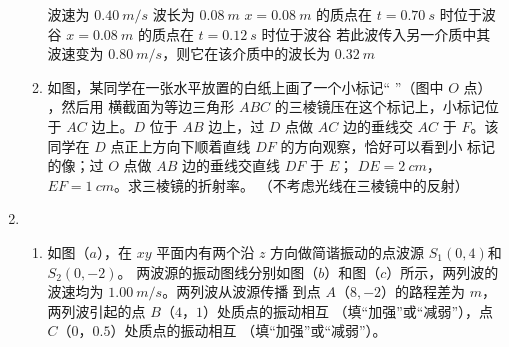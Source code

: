 \begin{enumerate}
\begin{enumerate}
\fivechoices
{波速为 $ 0.40 \ m /s $}
{波长为 $ 0.08 \ m $}
{$ x=0.08 \ m $ 的质点在 $ t=0.70 \ s $ 时位于波谷}
{$ x=0.08 \ m $ 的质点在 $ t=0.12 \ s $ 时位于波谷}
{若此波传入另一介质中其波速变为 $ 0.80 \ m /s $，则它在该介质中的波长为 $ 0.32 \ m $}






\item 
如图，某同学在一张水平放置的白纸上画了一个小标记“ ”（图中 $ O $ 点）
，然后用
横截面为等边三角形 $ ABC $ 的三棱镜压在这个标记上，小标记位于
$ AC $ 边上。$ D $ 位于 $ AB $ 边上，过 $ D $ 点做 $ AC $ 边的垂线交 $ AC $ 于 $ F $。该
同学在 $ D $ 点正上方向下顺着直线 $ DF $ 的方向观察，恰好可以看到小
标记的像；过 $ O $ 点做 $ AB $ 边的垂线交直线 $ DF $ 于 $ E $； $ DE=2 \ cm $，
$ EF=1 \ cm $。求三棱镜的折射率。
（不考虑光线在三棱镜中的反射）
\begin{figure}[h!]
	\flushright
	
\end{figure}





\end{enumerate}


\item 
{}
\begin{enumerate}
	\item
如图（$ a $），在 $ xy $ 平面内有两个沿 $ z $ 方向做简谐振动的点波源 $ S_{1} (0 , 4) $和 $ S_{2} (0 , -2) $。
两波源的振动图线分别如图（$ b $）和图（$ c $）所示，两列波的波速均为 $ 1.00 \ m /s $。两列波从波源传播
到点 $ A $（$ 8 , -2 $）的路程差为 \underlinegap $ m $，两列波引起的点 $ B $（$ 4 $，$ 1 $）处质点的振动相互 \underlinegap 
（填“加强”或“减弱”），点 $ C $（$ 0 $，$ 0.5 $）处质点的振动相互 \underlinegap （填“加强”或“减弱”）。
\begin{figure}[h!]
	\centering
\begin{subfigure}{0.4\linewidth}
	\centering
	 
	\caption{}\label{}
\end{subfigure}
\begin{subfigure}{0.4\linewidth}
	\centering
	 
	\caption{}\label{}
\end{subfigure}
\begin{subfigure}{0.4\linewidth}
	\centering
	 
	\caption{}\label{}
\end{subfigure}
\end{figure}



\end{enumerate}
\end{enumerate}
